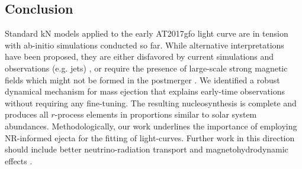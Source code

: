\subsection{Conclusion}

Standard kN models applied to the early AT2017gfo light curve are in
tension with ab-initio simulations conducted so far.
While alternative interpretations have been proposed, they are either
disfavored by current simulations and observations (e.g. jets) \citep{Bromberg:2017crh,Duffell:2018iig},
or require the presence of large-scale strong magnetic 
fields which might not be formed in the postmerger
\citep{Metzger:2018uni,Fernandez:2018kax,Radice:2018ghv,Ciolfi:2019fie}. 
We identified a robust dynamical mechanism for mass ejection that
explains early-time observations without requiring any fine-tuning.
The resulting nucleosynthesis is complete and produces all
$r$-process elements in proportions similar to solar system abundances.
Methodologically, our work underlines the importance of employing
NR-informed ejecta for the fitting of light-curves.
Further work in this direction should 
include better neutrino-radiation transport and magnetohydrodynamic effects
\citep{Siegel:2017nub,Fujibayashi:2017puw,Radice:2018xqa,Radice:2018pdn,Miller:2019dpt}. 





